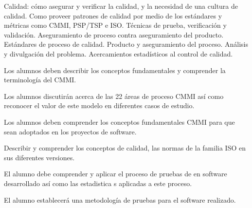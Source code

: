 \begin{syllabus}


\begin{justification}
Calidad: cómo asegurar y verificar la calidad, y la necesidad de una cultura de calidad. Como proveer patrones de
calidad por medio de los estándares y métricas como CMMI, PSP/TSP e ISO. Técnicas de prueba, verificación y validación.
Aseguramiento de proceso contra aseguramiento del producto. Estándares de proceso de calidad. Producto y
aseguramiento del proceso. Análisis y divulgación del problema. Acercamientos estadísticos al control de calidad.
\end{justification}

\begin{goals}
\item Los alumnos deben describir los conceptos fundamentales  y comprender la terminología del CMMI.
\item Los alumnos discutirán acerca de las 22 áreas de proceso CMMI así­ como reconocer el valor de este modelo en diferentes casos de estudio.
\item Los alumnos deben comprender los conceptos fundamentales  CMMI para que sean adoptados en los proyectos de software.
\item Describir y comprender los conceptos de calidad, las normas de la familia ISO en sus diferentes versiones.
\item El alumno debe comprender y aplicar el proceso de pruebas de en software desarrollado así­ como las estadistica s aplicadas a este proceso.
\item El alumno establecerá una metodología de pruebas para el software realizado.
\end{goals}

\begin{outcomes}
\end{outcomes}


\end{syllabus}
